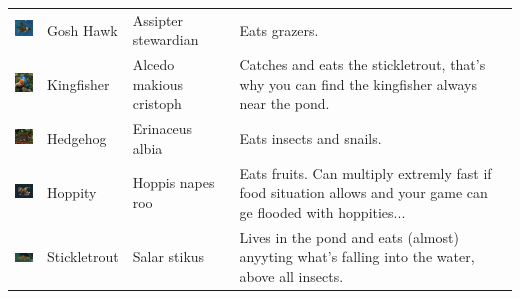 \documentclass[11pt,twoside,a4paper]{article}
\begin{document}
\begin{longtable}{ p{1.60cm} p{1.95cm} p{2.55cm} p{11.00cm} }
	\begin{minipage}[ht]{1.55cm} \includegraphics[width=1.50cm]{img/hawk.jpg} \end{minipage}		
																&	Gosh Hawk		&	Assipter \newline stewardian		
																&	Eats grazers.	\\
	\begin{minipage}[ht]{1.55cm} \includegraphics[width=1.50cm]{img/king.jpg} \end{minipage}		
																&	Kingfisher		&	Alcedo makious cristoph		
																&	Catches and eats the stickletrout, that's why you can find the kingfisher always near the pond. 	\\
	\begin{minipage}[ht]{1.55cm} \includegraphics[width=1.50cm]{img/igel.jpg} \end{minipage}		
																&	Hedgehog		&	Erinaceus albia		
																&	Eats insects and snails.	\\
	\begin{minipage}[ht]{1.55cm} \includegraphics[width=1.50cm]{img/hoppity2.jpg} \end{minipage}		
																&	Hoppity			&	Hoppis napes roo		
																&	Eats fruits. Can multiply extremly fast if food situation allows and your game can ge flooded with hoppities...	\\
	\begin{minipage}[ht]{1.55cm} \includegraphics[width=1.50cm]{img/stichling.jpg} \end{minipage}		
																&	Stickletrout	&	Salar stikus		
																&	Lives in the pond and eats (almost) anyyting what's falling into the water, above all insects.	\\

\end{longtable}
\end{document}
